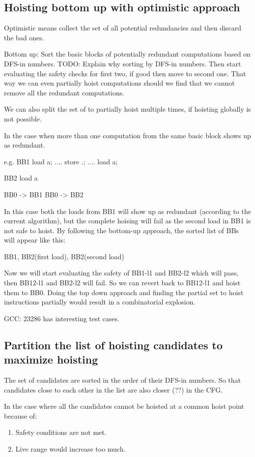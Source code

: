 \begin{section}
\section{Hoisting bottom up with optimistic approach}
Optimistic means collect the set of all potential redundancies and
then discard the bad ones.

Bottom up: Sort the basic blocks of potentially redundant computations
based on DFS-in numbers.  TODO: Explain why sorting by DFS-in numbers.
Then start evaluating the safety checks for first two, if good then
move to second one. That way we can even partially hoist computations
should we find that we cannot remove all the redundant computations.

We can also split the set of to partially hoist multiple times, if
hoisting globally is not possible.

In the case when more than one computation from the same basic block
shows up as redundant.

e.g.
BB1
load a;
....
store .;
....
load a;


BB2
load a

BB0 -> BB1
BB0 -> BB2

In this case both the loads from BB1 will show up as redundant
(according to the current algorithm), but the complete hoising will
fail as the second load in BB1 is not safe to hoist. By following the
bottom-up approach, the sorted list of BBs will appear like this:

{ BB1, BB2(first load), BB2(second load) }

Now we will start evaluating the safety of BB1-l1 and BB2-l2 which
will pass, then BB12-l1 and BB2-l2 will fail.  So we can revert back
to BB12-l1 and hoist them to BB0. Doing the top down approach and
finding the partial set to hoist instructions partially would result
in a combinatorial explosion.

GCC: 23286 has interesting test cases.

\section{Partition the list of hoisting candidates to maximize hoisting}
The set of candidates are sorted in the order of their DFS-in
numbers. So that candidates close to each other in the list are also
closer (??) in the CFG.

In the case where all the candidates cannot be hoisted at a common
hoist point because of:
\begin{enumerate}
\item Safety conditions are not met.
\item Live range would increase too much.
\end{enumerate}


\end{section}
